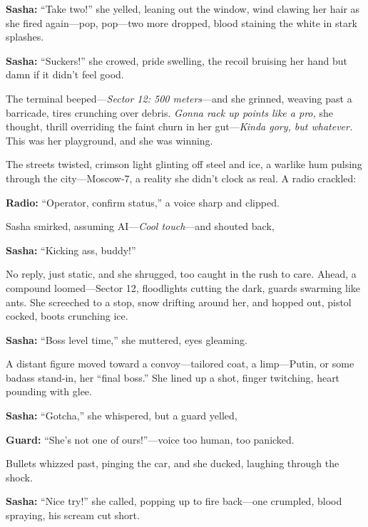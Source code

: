 \documentclass[12pt]{book}
\begin{document}
\vspace{0.5em}
\textbf{Sasha:} “Take two!” she yelled, leaning out the window, wind clawing her hair as she fired again—pop, pop—two more dropped, blood staining the white in stark splashes.

\vspace{0.5em}
\textbf{Sasha:} “Suckers!” she crowed, pride swelling, the recoil bruising her hand but damn if it didn’t feel good.

The terminal beeped—\emph{Sector 12: 500 meters}—and she grinned, weaving past a barricade, tires crunching over debris. \emph{Gonna rack up points like a pro,} she thought, thrill overriding the faint churn in her gut—\emph{Kinda gory, but whatever.} This was her playground, and she was winning.

The streets twisted, crimson light glinting off steel and ice, a warlike hum pulsing through the city—Moscow-7, a reality she didn’t clock as real. A radio crackled: 

\vspace{0.5em}
\textbf{Radio:} “Operator, confirm status,” a voice sharp and clipped.

Sasha smirked, assuming AI—\emph{Cool touch}—and shouted back, 

\vspace{0.5em}
\textbf{Sasha:} “Kicking ass, buddy!”

No reply, just static, and she shrugged, too caught in the rush to care. Ahead, a compound loomed—Sector 12, floodlights cutting the dark, guards swarming like ants. She screeched to a stop, snow drifting around her, and hopped out, pistol cocked, boots crunching ice. 

\vspace{0.5em}
\textbf{Sasha:} “Boss level time,” she muttered, eyes gleaming.

A distant figure moved toward a convoy—tailored coat, a limp—Putin, or some badass stand-in, her “final boss.” She lined up a shot, finger twitching, heart pounding with glee. 

\vspace{0.5em}
\textbf{Sasha:} “Gotcha,” she whispered, but a guard yelled, 

\vspace{0.5em}
\textbf{Guard:} “She’s not one of ours!”—voice too human, too panicked.

Bullets whizzed past, pinging the car, and she ducked, laughing through the shock. 

\vspace{0.5em}
\textbf{Sasha:} “Nice try!” she called, popping up to fire back—one crumpled, blood spraying, his scream cut short.
\end{document}
